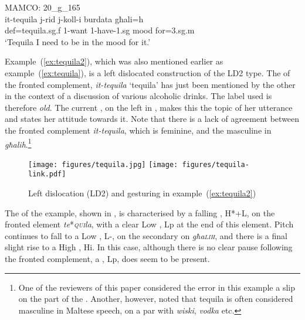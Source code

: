 \documentclass[output=paper]{LSP/langsci}
\begin{document}

\ea\label{ex:tequila2}
{MAMCO: 20\_g\_165}\\
\gll it-tequila j-rid j-koll-i burdata għali=h\\
     {\sc def}=tequila.{\sc sg.f} 1-want  1-have-{\sc 1.sg} mood for={\sc 3.sg.m}\\
\glt `Tequila I need to be in the mood for it.'
\z



Example~(\ref{ex:tequila2}), which was also mentioned earlier as
example~(\ref{ex:tequila}), is a left dislocated construction of the
LD2 type. The  of the fronted complement, {\em it-tequila}
`tequila' has just been mentioned by the other  in the context
of a discussion of various alcoholic drinks. The 
label used is therefore {\em old}. The current , on the left in
, makes this  the topic of her
utterance and states her attitude towards it.
Note that there is a lack of agreement between the fronted complement
{\em it-tequila}, which is feminine, and the masculine  in {\em
  għalih}.\footnote{One of the reviewers of this paper considered the error in this example a slip on the part of the . Another, however, noted that tequila is often considered masculine in Maltese speech, on a par with {\em wiski}, {\em vodka} etc.}


\begin{figure}[b]
  \texttt{[image: figures/tequila.jpg]}
   \texttt{[image: figures/tequila-link.pdf]}
   \caption{Left dislocation (LD2) and gesturing in example~(\ref{ex:tequila2})}
\label{fig:tequila}
\end{figure}

\clearpage
The  of the example, shown in ,
is characterised by a falling , H*+L, on the fronted
element {\it te}*{\textit{\textsc{qui}}}{\it la}, with a clear Low
, Lp at the end of this element. Pitch continues to
fall to a Low , L-, on the secondary  on {\it
  għa}{\textit{\textsc{lih}}}, and there is a final slight rise to a
High , Hi. In this case, although there is no clear pause
following the fronted complement, a  , Lp,
does seem to be present.
\end{document}
